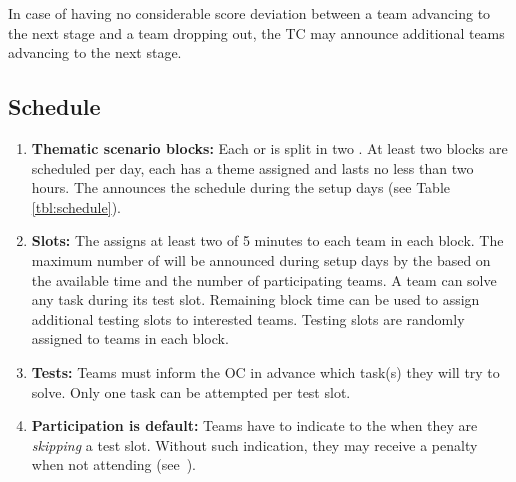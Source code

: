 In case of having no considerable score deviation between a team advancing to the next stage and a team dropping out, the TC may announce additional teams advancing to the next stage.


\subsection{Schedule}
\label{rule:schedule}

\begin{enumerate}
	\item \textbf{Thematic scenario blocks:} Each  or  is split in two .
	At least two blocks are scheduled per day, each has a theme assigned and lasts no less than two hours.
	The  announces the schedule during the setup days (see Table \ref{tbl:schedule}).

	\item \textbf{Slots:} The  assigns at least two  of 5 minutes to each team in each block.
   The maximum number of  will be announced during setup days by the  based on the available time and the number of participating teams.
	A team can solve any task during its test slot.
	Remaining block time can be used to assign additional testing slots to interested teams.
	Testing slots are randomly assigned to teams in each block.

	\item \textbf{Tests:} Teams must inform the OC in advance which task(s) they will try to solve.
	Only one task can be attempted per test slot.

	\item \textbf{Participation is default:} Teams have to indicate to the  when they are \emph{skipping} a test slot. Without such indication, they may receive a penalty when not attending (see~).
\end{enumerate}

